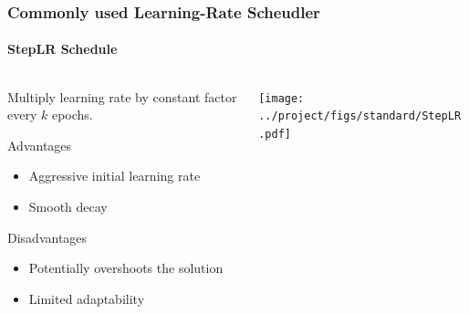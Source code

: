 \documentclass[10pt,aspectratio=169]{beamer}
\begin{document}
    
    \begin{frame}
        \frametitle{Commonly used Learning-Rate Scheudler}        
        \framesubtitle{StepLR Schedule}
        
        \begin{columns}
            \begin{column}{0.5\textwidth}
                Multiply learning rate by constant factor every $k$ epochs. 
                \vspace{0.5cm}

                Advantages
                \begin{itemize}
                    \item Aggressive initial learning rate
                    \item Smooth decay 
                \end{itemize}

                Disadvantages
                \begin{itemize}
                    \item Potentially overshoots the solution
                    \item Limited adaptability
                \end{itemize}
            \end{column}
            \begin{column}{0.5\textwidth}
                \texttt{[image: ../project/figs/standard/StepLR.pdf]}
            \end{column}
        \end{columns}
    \end{frame}
\end{document}
